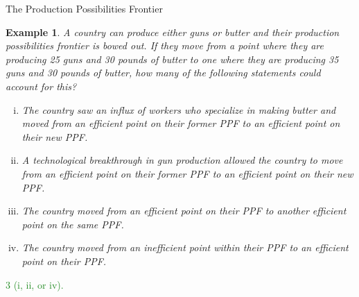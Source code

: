 \documentclass[xcolor={dvipsnames},pdf, hyperref={colorlinks=true, citecolor=ForestGreen, linkcolor=BlueViolet, urlcolor=Magenta}]{beamer}
\newtheorem{exmp}{Example}[section]
\newcommand{\blank}[0]{}
\newcommand{\ddp}[1]{{\textcolor{ForestGreen}{#1}}}
\begin{document}
\begin{frame}{The Production Possibilities Frontier}
	\begin{exmp}
		\footnotesize
		A country can produce either guns or butter and their production possibilities frontier is bowed out. If they move from a point where they are producing 25 guns and 30 pounds of butter to one where they are producing 35 guns and 30 pounds of butter, how many of the following statements could account for this?
		
		\begin{enumerate}[i.]
			\item The country saw an influx of workers who specialize in making butter and moved from an efficient point on their former PPF to an efficient point on their new PPF.
			\item A technological breakthrough in gun production allowed the country to move from an efficient point on their former PPF to an efficient point on their new PPF. 
			\item The country moved from an efficient point on their PPF to another efficient point on the same PPF.
			\item The country moved from an inefficient point within their PPF to an efficient point on their PPF.
		\end{enumerate}
	\end{exmp}
\blank
\blank
	\ddp{\pause \small 3 (i, ii, or iv).}
\end{frame}
\end{document}
